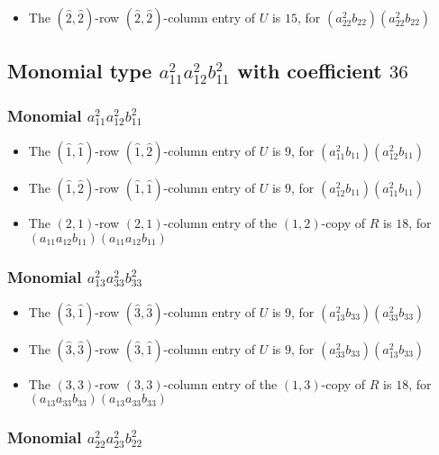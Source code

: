 \documentclass{article}
\begin{document}
\begin{itemize}
\item The $(\hat{2}, \hat{2})$-row $(\hat{2}, \hat{2})$-column entry of $U$ is $15$, for $( a_{22}^{2} b_{22} )( a_{22}^{2} b_{22} )$ 
\end{itemize}
\subsection{Monomial type $ a_{11}^{2} a_{12}^{2} b_{11}^{2} $ with coefficient $ 36 $}

\subsubsection{Monomial $ a_{11}^{2} a_{12}^{2} b_{11}^{2} $}

\begin{itemize}
\item The $(\hat{1}, \hat{1})$-row $(\hat{1}, \hat{2})$-column entry of $U$ is $9$, for $( a_{11}^{2} b_{11} )( a_{12}^{2} b_{11} )$ 
\item The $(\hat{1}, \hat{2})$-row $(\hat{1}, \hat{1})$-column entry of $U$ is $9$, for $( a_{12}^{2} b_{11} )( a_{11}^{2} b_{11} )$ 
\item The $(2, 1)$-row $(2, 1)$-column entry of the $ \left(1, 2\right) $-copy of $R$ is $ 18 $, for $( a_{11} a_{12} b_{11} )( a_{11} a_{12} b_{11} )$ 
\end{itemize}
\subsubsection{Monomial $ a_{13}^{2} a_{33}^{2} b_{33}^{2} $}

\begin{itemize}
\item The $(\hat{3}, \hat{1})$-row $(\hat{3}, \hat{3})$-column entry of $U$ is $9$, for $( a_{13}^{2} b_{33} )( a_{33}^{2} b_{33} )$ 
\item The $(\hat{3}, \hat{3})$-row $(\hat{3}, \hat{1})$-column entry of $U$ is $9$, for $( a_{33}^{2} b_{33} )( a_{13}^{2} b_{33} )$ 
\item The $(3, 3)$-row $(3, 3)$-column entry of the $ \left(1, 3\right) $-copy of $R$ is $ 18 $, for $( a_{13} a_{33} b_{33} )( a_{13} a_{33} b_{33} )$ 
\end{itemize}
\subsubsection{Monomial $ a_{22}^{2} a_{23}^{2} b_{22}^{2} $}
\end{document}
